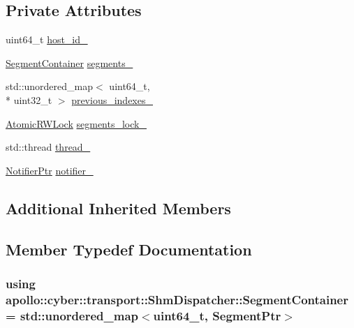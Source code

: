 \subsection*{Private Attributes}
\begin{DoxyCompactItemize}
\item 
uint64\-\_\-t \hyperlink{classapollo_1_1cyber_1_1transport_1_1ShmDispatcher_a82f0599420023c170f75a7416d64cbae}{host\-\_\-id\-\_\-}
\item 
\hyperlink{classapollo_1_1cyber_1_1transport_1_1ShmDispatcher_af4b802d682732bf22e6f0d04fe0bb620}{Segment\-Container} \hyperlink{classapollo_1_1cyber_1_1transport_1_1ShmDispatcher_a8b86c460d2e97b8930092bb6ab340e8c}{segments\-\_\-}
\item 
std\-::unordered\-\_\-map$<$ uint64\-\_\-t, \\*
uint32\-\_\-t $>$ \hyperlink{classapollo_1_1cyber_1_1transport_1_1ShmDispatcher_a47df1c1d054a9cc0c90c7d01233eee1f}{previous\-\_\-indexes\-\_\-}
\item 
\hyperlink{classapollo_1_1cyber_1_1base_1_1AtomicRWLock}{Atomic\-R\-W\-Lock} \hyperlink{classapollo_1_1cyber_1_1transport_1_1ShmDispatcher_a23aa8263a8498b815f2b60afff385abd}{segments\-\_\-lock\-\_\-}
\item 
std\-::thread \hyperlink{classapollo_1_1cyber_1_1transport_1_1ShmDispatcher_a88cab9f1044db26107a7e44fb9a7955b}{thread\-\_\-}
\item 
\hyperlink{namespaceapollo_1_1cyber_1_1transport_ad7de1bbf34457c17c4d04b9bbfe152b4}{Notifier\-Ptr} \hyperlink{classapollo_1_1cyber_1_1transport_1_1ShmDispatcher_a2ca1a561c8b73f6f41f32422eb466eaa}{notifier\-\_\-}
\end{DoxyCompactItemize}
\subsection*{Additional Inherited Members}


\subsection{Member Typedef Documentation}
\hypertarget{classapollo_1_1cyber_1_1transport_1_1ShmDispatcher_af4b802d682732bf22e6f0d04fe0bb620}{
\subsubsection[{Segment\-Container}]{\setlength{\rightskip}{0pt plus 5cm}using {\bf apollo\-::cyber\-::transport\-::\-Shm\-Dispatcher\-::\-Segment\-Container} =  std\-::unordered\-\_\-map$<$uint64\-\_\-t, {\bf Segment\-Ptr}$>$}}\label{classapollo_1_1cyber_1_1transport_1_1ShmDispatcher_af4b802d682732bf22e6f0d04fe0bb620}


